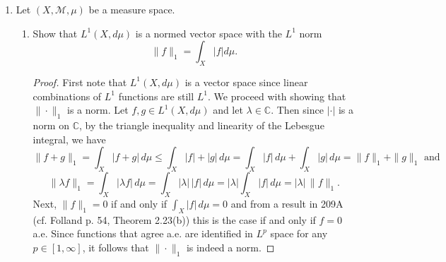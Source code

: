 \documentclass[11pt,oneside,english]{amsart}
\theoremstyle{definition}
\newcommand{\pspace}{\hspace{10mm}}
\newcommand{\MC}[1]{\mathcal{#1}}
\newcommand{\MB}[1]{\mathbb{#1}}
\begin{document}
\begin{enumerate}
\begin{enumerate}
\item Show that $f(x)=x^p:[0,\infty)\to\MB{R}$, $p\ge 1$, is convex. Then show that
\[
(a+b)^p\le 2^{p-1}\cdot (a^p+b^p),\ \forall a,b\ge 0.
\]
\end{enumerate}

\begin{proof}
$f''(x)=p(p-1)x^{p-2}\geq0$ for all $x\in[0,\infty)$ so $f$ is convex by part (b) above. Thus, for $a,b\in [0,\infty)$, we have
\[
(ta+(1-t)b)^p\leq ta^p+(1-t)b^p\pspace\text{for all }t\in[0,1].
\]
In particular, this is true for $t=\frac{1}{2}$. When $t=\frac{1}{2}$, we have
\begin{align*}
\left(\frac{a}{2}+\frac{b}{2}\right)^p&\leq\frac{a^p}{2}+\frac{b^p}{2}\\[2mm]
\left(\frac{a+b}{2}\right)^p&\leq\frac{a^p+b^p}{2}\\[2mm]
\frac{(a+b)^p}{2^p}&\leq\frac{a^p+b^p}{2}\\[2mm]
(a+b)^p&\le 2^{p-1}(a^p+b^p)
\end{align*}
\end{proof}

\item Let $(X,\MC{M}, \mu)$ be a measure space.
\begin{enumerate}
\itemsep7mm
\item Show that $L^1(X,d\mu)$ is a normed vector space with the $L^1$ norm
\[
\|f\|_1=\int_X|f|d\mu.
\]

\begin{proof}
First note that $L^1(X,d\mu)$ is a vector space since linear combinations of $L^1$ functions are still $L^1$. We proceed with showing that $\|\cdot\|_1$ is a norm. Let $f,g\in L^1(X,d\mu)$ and let $\lambda\in \MB{C}$. Then since $|\cdot|$ is a norm on $\MB{C}$, by the triangle inequality and linearity of the Lebesgue integral, we have
\[
\|f+g\|_1=\int_X|f+g|\,d\mu\leq\int_X|f|+|g|\,d\mu=\int_X|f|\,d\mu+\int_X|g|\,d\mu=\|f\|_1+\|g\|_1\text{ and}
\]
\[
\|\lambda f\|_1=\int_X|\lambda f|\,d\mu=\int_X|\lambda|\,|f|\,d\mu=|\lambda|\int_X|f|\,d\mu=|\lambda|\,\|f\|_1.
\]
Next, $\|f\|_1=0$ if and only if $\int_X|f|\,d\mu=0$ and from a result in 209A (cf. Folland p. 54, Theorem 2.23(b)) this is the case if and only if $f=0$ a.e. Since functions that agree a.e. are identified in $L^p$ space for any $p\in[1,\infty]$, it follows that $\|\cdot\|_1$ is indeed a norm.
\end{proof}


\end{enumerate}
\end{enumerate}
\end{document}
